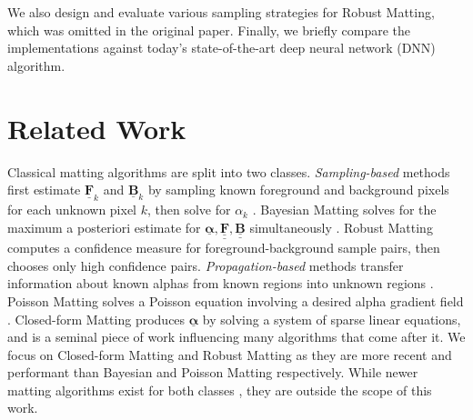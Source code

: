 \documentclass{article}
\theoremstyle{definition}
\def\vt#1{\underline{\mathbf{#1}}}
\def\vts#1{\underline{\boldsymbol{#1}}}
\def\mt#1{\underline{\underline{\mathbf{#1}}}}
\begin{document}
\begin{multicols}{2}[]
We also design and evaluate various sampling strategies for Robust Matting, which was omitted in the original paper. Finally, we briefly compare the implementations against today's state-of-the-art deep neural network (DNN) algorithm.





\section{Related Work}

Classical matting algorithms are split into two classes. \emph{Sampling-based} methods first estimate $\vt F_k$ and $\vt B_k$ by sampling known foreground and background pixels for each unknown pixel $k$, then solve for $\alpha_k$ \cite{dim-paper}. Bayesian Matting solves for the maximum a posteriori estimate for $\vts \alpha,\mt F,\mt B$ simultaneously \cite{bayesian-matting}. Robust Matting computes a confidence measure for foreground-background sample pairs, then chooses only high confidence pairs. \emph{Propagation-based} methods transfer information about known alphas from known regions into unknown regions \cite{dim-paper}. Poisson Matting solves a Poisson equation involving a desired alpha gradient field \cite{poisson-matting}. Closed-form Matting produces $\vts \alpha$ by solving a system of sparse linear equations, and is a seminal piece of work influencing many algorithms that come after it. We focus on Closed-form Matting and Robust Matting as they are more recent and performant than Bayesian and Poisson Matting respectively. While newer matting algorithms exist for both classes \cite{closed-form-survey}, they are outside the scope of this work. %


\end{multicols}
\end{document}
